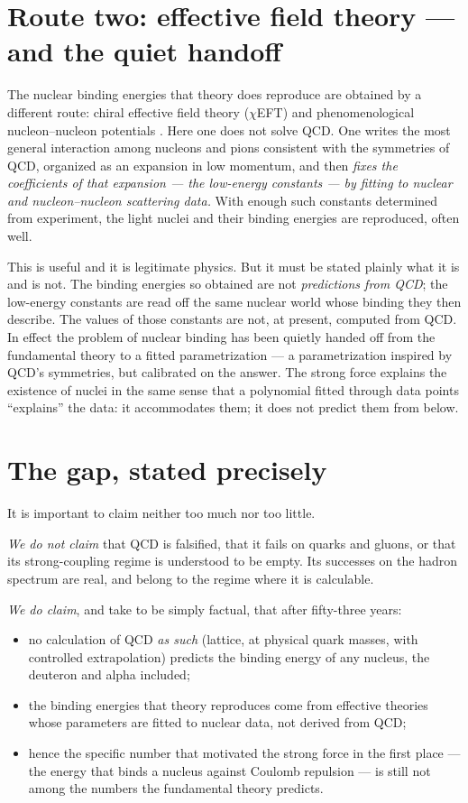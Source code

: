 \documentclass[11pt]{article}
\begin{document}
\section{Route two: effective field theory --- and the quiet handoff}
\label{sec:eft}

The nuclear binding energies that theory does reproduce are obtained by a different route: chiral
effective field theory (\(\chi\)EFT) and phenomenological nucleon--nucleon potentials
\cite{weinberg1990,epelbaum2009}. Here one does not solve QCD. One writes the most general interaction
among nucleons and pions consistent with the symmetries of QCD, organized as an expansion in
low momentum, and then \emph{fixes the coefficients of that expansion --- the low-energy constants --- by
fitting to nuclear and nucleon--nucleon scattering data.} With enough such constants determined from
experiment, the light nuclei and their binding energies are reproduced, often well.

This is useful and it is legitimate physics. But it must be stated plainly what it is and is not. The
binding energies so obtained are not \emph{predictions from QCD}; the low-energy constants are read off
the same nuclear world whose binding they then describe. The values of those constants are not, at
present, computed from QCD. In effect the problem of nuclear binding has been quietly handed off from the
fundamental theory to a fitted parametrization --- a parametrization inspired by QCD's symmetries, but
calibrated on the answer. The strong force explains the existence of nuclei in the same sense that a
polynomial fitted through data points ``explains'' the data: it accommodates them; it does not predict
them from below.

\section{The gap, stated precisely}
\label{sec:gap}

It is important to claim neither too much nor too little.

\emph{We do not claim} that QCD is falsified, that it fails on quarks and gluons, or that its
strong-coupling regime is understood to be empty. Its successes on the hadron spectrum are real, and
belong to the regime where it is calculable.

\emph{We do claim}, and take to be simply factual, that after fifty-three years:
\begin{itemize}
\item no calculation of QCD \emph{as such} (lattice, at physical quark masses, with controlled
  extrapolation) predicts the binding energy of any nucleus, the deuteron and alpha included;
\item the binding energies that theory reproduces come from effective theories whose parameters are
  fitted to nuclear data, not derived from QCD;
\item hence the specific number that motivated the strong force in the first place --- the energy that
  binds a nucleus against Coulomb repulsion --- is still not among the numbers the fundamental theory
  predicts.
\end{itemize}
\end{document}
